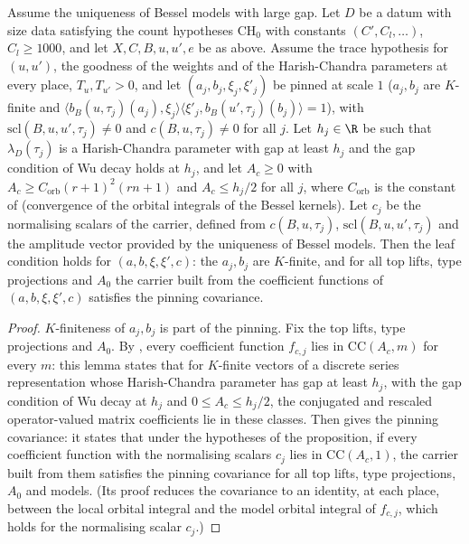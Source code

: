 \begin{proposition}\label{pf:thmS:xleaf}
Assume the uniqueness of Bessel models with large gap. Let $D$ be a datum with size data satisfying the count hypotheses
$\mathrm{CH}_0$ with constants $(C',C_l,\dots)$, $C_l\ge1000$, and let $X,C,B,u,u',e$ be as above. Assume the trace hypothesis for
$(u,u')$, the goodness of the weights and of the Harish-Chandra parameters at every place, $T_u,T_{u'}>0$, and let
$(a_j,b_j,\xi_j,\xi'_j)$ be pinned at scale $1$ ($a_j,b_j$ are $K$-finite and
$\langle b_B(u,\tau_j)(a_j),\xi_j\rangle\langle\xi'_j,b_B(u',\tau_j)(b_j)\rangle=1$), with $\mathrm{scl}(B,u,u',\tau_j)\ne0$ and
$c(B,u,\tau_j)\ne0$ for all $j$. Let $h_j\in\R$ be such that $\lambda_D(\tau_j)$ is a Harish-Chandra parameter with gap at least
$h_j$ and the gap condition of Wu decay holds at $h_j$, and let $A_c\ge0$ with $A_c\ge C_{\mathrm{orb}}(r+1)^2(rn+1)$ and
$A_c\le h_j/2$ for all $j$, where $C_{\mathrm{orb}}$ is the constant of
 (convergence of the orbital integrals of the Bessel kernels).
Let $c_j$ be the normalising scalars of the carrier, defined from $c(B,u,\tau_j)$, $\mathrm{scl}(B,u,u',\tau_j)$ and the
amplitude vector provided by the uniqueness of Bessel models. Then the leaf condition holds for $(a,b,\xi,\xi',c)$: the $a_j,b_j$
are $K$-finite, and for all top lifts, type projections and $A_0$ the carrier built from the coefficient functions of
$(a,b,\xi,\xi',c)$ satisfies the pinning covariance.
\end{proposition}

\begin{proof}
$K$-finiteness of $a_j,b_j$ is part of the pinning. Fix the top lifts, type projections and $A_0$. By
, every coefficient function $f_{c,j}$ lies in $\mathrm{CC}(A_c,m)$ for every $m$:
this lemma states that for $K$-finite vectors of a discrete series representation whose Harish-Chandra parameter has gap at least
$h_j$, with the gap condition of Wu decay at $h_j$ and $0\le A_c\le h_j/2$, the conjugated and rescaled operator-valued matrix
coefficients lie in these classes. Then  gives the pinning covariance: it states
that under the hypotheses of the proposition, if every coefficient function with the normalising scalars $c_j$ lies in
$\mathrm{CC}(A_c,1)$, the carrier built from them satisfies the pinning covariance for all top lifts, type projections, $A_0$ and
models. (Its proof reduces the covariance to an identity, at each place, between the local orbital integral and the model orbital
integral of $f_{c,j}$, which holds for the normalising scalar $c_j$.)
\end{proof}

